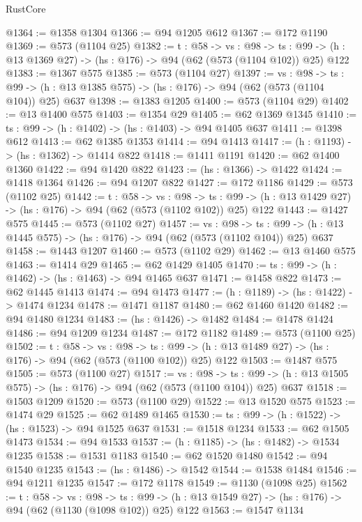 \begin{lexlean}{RustCore}
\begin{coremodule}
@1364 := @1358 @1304
@1366 := @94 @1205 @612
@1367 := @172 @1190
@1369 := @573 (@1104 @25)
@1382 := {t : @58} ->
  {vs : @98} ->
  {ts : @99} -> (h : @13 @1369 @27) -> (hs : @176) -> @94 (@62 (@573 (@1104 @102)) @25) @122
@1383 := @1367 @575
@1385 := @573 (@1104 @27)
@1397 := {vs : @98} ->
  {ts : @99} -> (h : @13 @1385 @575) -> (hs : @176) -> @94 (@62 (@573 (@1104 @104)) @25) @637
@1398 := @1383 @1205
@1400 := @573 (@1104 @29)
@1402 := @13 @1400 @575
@1403 := @1354 @29
@1405 := @62 @1369 @1345
@1410 := {ts : @99} -> (h : @1402) -> (hs : @1403) -> @94 @1405 @637
@1411 := @1398 @612
@1413 := @62 @1385 @1353
@1414 := @94 @1413
@1417 := (h : @1193) -> (hs : @1362) -> @1414 @822
@1418 := @1411 @1191
@1420 := @62 @1400 @1360
@1422 := @94 @1420 @822
@1423 := (hs : @1366) -> @1422
@1424 := @1418 @1364
@1426 := @94 @1207 @822
@1427 := @172 @1186
@1429 := @573 (@1102 @25)
@1442 := {t : @58} ->
  {vs : @98} ->
  {ts : @99} -> (h : @13 @1429 @27) -> (hs : @176) -> @94 (@62 (@573 (@1102 @102)) @25) @122
@1443 := @1427 @575
@1445 := @573 (@1102 @27)
@1457 := {vs : @98} ->
  {ts : @99} -> (h : @13 @1445 @575) -> (hs : @176) -> @94 (@62 (@573 (@1102 @104)) @25) @637
@1458 := @1443 @1207
@1460 := @573 (@1102 @29)
@1462 := @13 @1460 @575
@1463 := @1414 @29
@1465 := @62 @1429 @1405
@1470 := {ts : @99} -> (h : @1462) -> (hs : @1463) -> @94 @1465 @637
@1471 := @1458 @822
@1473 := @62 @1445 @1413
@1474 := @94 @1473
@1477 := (h : @1189) -> (hs : @1422) -> @1474 @1234
@1478 := @1471 @1187
@1480 := @62 @1460 @1420
@1482 := @94 @1480 @1234
@1483 := (hs : @1426) -> @1482
@1484 := @1478 @1424
@1486 := @94 @1209 @1234
@1487 := @172 @1182
@1489 := @573 (@1100 @25)
@1502 := {t : @58} ->
  {vs : @98} ->
  {ts : @99} -> (h : @13 @1489 @27) -> (hs : @176) -> @94 (@62 (@573 (@1100 @102)) @25) @122
@1503 := @1487 @575
@1505 := @573 (@1100 @27)
@1517 := {vs : @98} ->
  {ts : @99} -> (h : @13 @1505 @575) -> (hs : @176) -> @94 (@62 (@573 (@1100 @104)) @25) @637
@1518 := @1503 @1209
@1520 := @573 (@1100 @29)
@1522 := @13 @1520 @575
@1523 := @1474 @29
@1525 := @62 @1489 @1465
@1530 := {ts : @99} -> (h : @1522) -> (hs : @1523) -> @94 @1525 @637
@1531 := @1518 @1234
@1533 := @62 @1505 @1473
@1534 := @94 @1533
@1537 := (h : @1185) -> (hs : @1482) -> @1534 @1235
@1538 := @1531 @1183
@1540 := @62 @1520 @1480
@1542 := @94 @1540 @1235
@1543 := (hs : @1486) -> @1542
@1544 := @1538 @1484
@1546 := @94 @1211 @1235
@1547 := @172 @1178
@1549 := @1130 (@1098 @25)
@1562 := {t : @58} ->
  {vs : @98} ->
  {ts : @99} -> (h : @13 @1549 @27) -> (hs : @176) -> @94 (@62 (@1130 (@1098 @102)) @25) @122
@1563 := @1547 @1134

\end{coremodule}
\end{lexlean}
